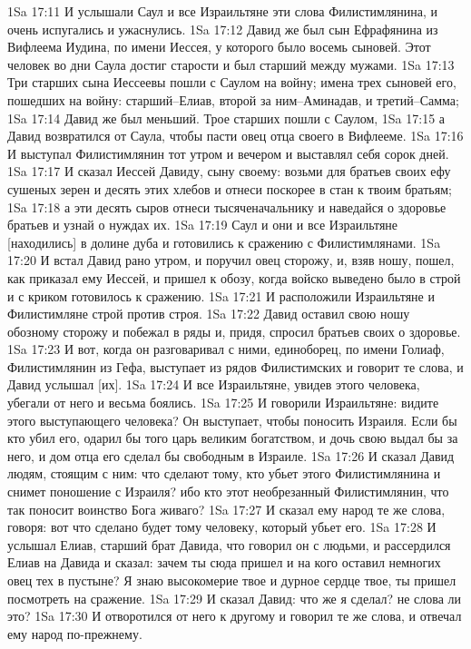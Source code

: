 1Sa 17:11  И услышали Саул и все Израильтяне эти слова Филистимлянина, и очень испугались и ужаснулись.
1Sa 17:12  Давид же был сын Ефрафянина из Вифлеема Иудина, по имени Иессея, у которого было восемь сыновей. Этот человек во дни Саула достиг старости и был старший между мужами.
1Sa 17:13  Три старших сына Иессеевы пошли с Саулом на войну; имена трех сыновей его, пошедших на войну: старший--Елиав, второй за ним--Аминадав, и третий--Самма;
1Sa 17:14  Давид же был меньший. Трое старших пошли с Саулом,
1Sa 17:15  а Давид возвратился от Саула, чтобы пасти овец отца своего в Вифлееме.
1Sa 17:16  И выступал Филистимлянин тот утром и вечером и выставлял себя сорок дней.
1Sa 17:17  И сказал Иессей Давиду, сыну своему: возьми для братьев своих ефу сушеных зерен и десять этих хлебов и отнеси поскорее в стан к твоим братьям;
1Sa 17:18  а эти десять сыров отнеси тысяченачальнику и наведайся о здоровье братьев и узнай о нуждах их.
1Sa 17:19  Саул и они и все Израильтяне [находились] в долине дуба и готовились к сражению с Филистимлянами.
1Sa 17:20  И встал Давид рано утром, и поручил овец сторожу, и, взяв ношу, пошел, как приказал ему Иессей, и пришел к обозу, когда войско выведено было в строй и с криком готовилось к сражению.
1Sa 17:21  И расположили Израильтяне и Филистимляне строй против строя.
1Sa 17:22  Давид оставил свою ношу обозному сторожу и побежал в ряды и, придя, спросил братьев своих о здоровье.
1Sa 17:23  И вот, когда он разговаривал с ними, единоборец, по имени Голиаф, Филистимлянин из Гефа, выступает из рядов Филистимских и говорит те слова, и Давид услышал [их].
1Sa 17:24  И все Израильтяне, увидев этого человека, убегали от него и весьма боялись.
1Sa 17:25  И говорили Израильтяне: видите этого выступающего человека? Он выступает, чтобы поносить Израиля. Если бы кто убил его, одарил бы того царь великим богатством, и дочь свою выдал бы за него, и дом отца его сделал бы свободным в Израиле.
1Sa 17:26  И сказал Давид людям, стоящим с ним: что сделают тому, кто убьет этого Филистимлянина и снимет поношение с Израиля? ибо кто этот необрезанный Филистимлянин, что так поносит воинство Бога живаго?
1Sa 17:27  И сказал ему народ те же слова, говоря: вот что сделано будет тому человеку, который убьет его.
1Sa 17:28  И услышал Елиав, старший брат Давида, что говорил он с людьми, и рассердился Елиав на Давида и сказал: зачем ты сюда пришел и на кого оставил немногих овец тех в пустыне? Я знаю высокомерие твое и дурное сердце твое, ты пришел посмотреть на сражение.
1Sa 17:29  И сказал Давид: что же я сделал? не слова ли это?
1Sa 17:30  И отворотился от него к другому и говорил те же слова, и отвечал ему народ по-прежнему.
